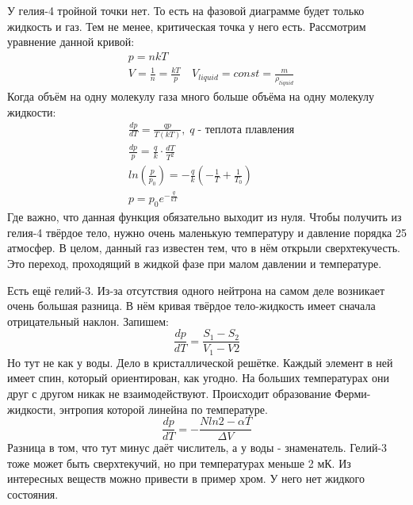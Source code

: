 \documentclass[a4paper, 12pt]{article}
\begin{document}
	У гелия-4 тройной точки нет. То есть на фазовой диаграмме будет только жидкость и газ. Тем не менее, критическая точка у него есть. Рассмотрим уравнение данной кривой:
	\begin{equation*}
		\begin{aligned}
			& p = nkT                                                                           \\
			& V = \frac{1}{n} = \frac{kT}{p} \quad V_{liquid} = const = \frac{m}{\rho_{liquid}} 
		\end{aligned}
	\end{equation*}
	Когда объём на одну молекулу газа много больше объёма на одну молекулу жидкости: 
	\begin{equation*}
		\begin{aligned}
			& \frac{dp}{dT} = \frac{qp}{T(kT)}, \; q  \; \text{- теплота плавления} \\
			& \frac{dp}{p} = \frac{q}{k} \cdot \frac{dT}{T^{2}}                                     \\
			& ln(\frac{p}{p_{0}}) = -\frac{q}{k}(-\frac{1}{T}+\frac{1}{T_0})                        \\
			& p = p_{0} e^{-\frac{q}{kT}}                                                           
		\end{aligned}
	\end{equation*}
	Где важно, что данная функция обязательно выходит из нуля. Чтобы получить из гелия-4 твёрдое тело, нужно очень маленькую температуру и давление порядка 25 атмосфер. В целом, данный газ известен тем, что в нём открыли сверхтекучесть. Это переход, проходящий в жидкой фазе при малом давлении и температуре. 
	
	Есть ещё гелий-3. Из-за отсутствия одного нейтрона на самом деле возникает очень большая разница. В нём кривая твёрдое тело-жидкость имеет сначала отрицательный наклон. Запишем: 
	\begin{equation*}
		\frac{dp}{dT} = \frac{S_{1}-S_{2}}{V_{1}-V{2}}
	\end{equation*}
	Но тут не как у воды. Дело в кристаллической решётке. Каждый элемент в ней имеет спин, который ориентирован, как угодно. На больших температурах они друг с другом никак не взаимодействуют. Происходит образование Ферми-жидкости, энтропия которой линейна по температуре.
	\begin{equation*}
		\frac{dp}{dT} = -\frac{Nln2 - \alpha T}{\Delta V}
	\end{equation*}
	Разница в том, что тут минус даёт числитель, а у воды - знаменатель. Гелий-3 тоже может быть сверхтекучий, но при температурах меньше 2 мК. Из интересных веществ можно привести в пример хром. У него нет жидкого состояния.
\end{document}
